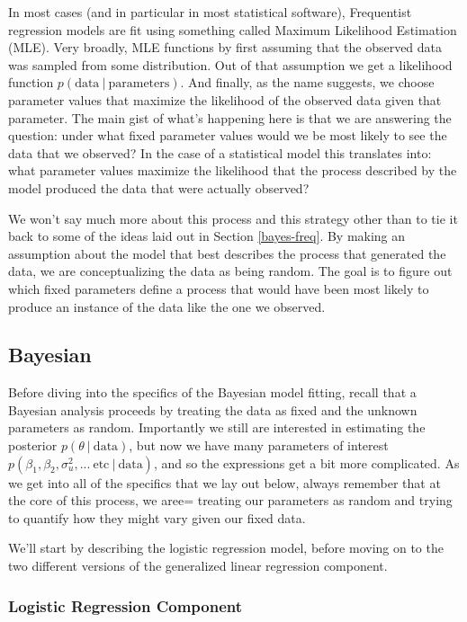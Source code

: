 \documentclass[12pt,twoside]{reedthesis}
\begin{document}
In most cases (and in particular in most statistical software), Frequentist regression models are fit using something called Maximum Likelihood Estimation (MLE). Very broadly, MLE functions by first assuming that the observed data was sampled from some distribution. Out of that assumption we get a likelihood function \(p(\text{data} \ | \ \text{parameters})\). And finally, as the name suggests, we choose parameter values that maximize the likelihood of the observed data given that parameter. The main gist of what's happening here is that we are answering the question: under what fixed parameter values would we be most likely to see the data that we observed? In the case of a statistical model this translates into: what parameter values maximize the likelihood that the process described by the model produced the data that were actually observed?

We won't say much more about this process and this strategy other than to tie it back to some of the ideas laid out in Section \ref{bayes-freq}. By making an assumption about the model that best describes the process that generated the data, we are conceptualizing the data as being random. The goal is to figure out which fixed parameters define a process that would have been most likely to produce an instance of the data like the one we observed.

\hypertarget{bayesian}{%
\subsection{Bayesian}\label{bayesian}}

Before diving into the specifics of the Bayesian model fitting, recall that a Bayesian analysis proceeds by treating the data as fixed and the unknown parameters as random. Importantly we still are interested in estimating the posterior \(p(\theta \ | \ \text{data})\), but now we have many parameters of interest \(p(\beta_1, \beta_2, \sigma^2_{u}, ... \ \text{etc} \ | \ \text{data})\), and so the expressions get a bit more complicated. As we get into all of the specifics that we lay out below, always remember that at the core of this process, we aree= treating our parameters as random and trying to quantify how they might vary given our fixed data.

We'll start by describing the logistic regression model, before moving on to the two different versions of the generalized linear regression component.

\hypertarget{logistic-regression-component}{%
\subsubsection{Logistic Regression Component}\label{logistic-regression-component}}
\end{document}
